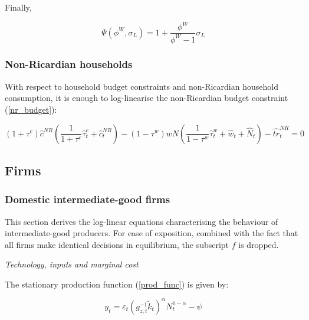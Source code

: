 \documentclass[a4paper,11pt]{article}
\numberwithin{equation}{section}
\begin{document}
	Finally, 
	
	\begin{equation*}
	\Psi(\phi^W,\sigma_L)=1+\frac{\phi^W}{\phi^W-1}\sigma_L
	\end{equation*} 
	
	\subsubsection{Non-Ricardian households}
	
	With respect to household budget constraints and non-Ricardian household consumption, it is enough to log-linearise the non-Ricardian budget constraint (\ref{nr_budget}):
	
	
	\begin{equation}
	\left(1+\tau^c\right)\hat{c}^{NR}\left(\frac{1}{1+\tau^c}\hat{\tau}_t^c+\hat{c}_t^{NR}\right)-\left(1-\tau^w\right)wN\left(\frac{1}{1-\tau^w}\hat{\tau}_t^w+\hat{w}_t+\hat{N}_t\right)-\hat{tr}_t^{NR} = 0
	\end{equation}
	
	\subsection{Firms}
	\subsubsection{Domestic intermediate-good firms}
	
	This section derives the log-linear equations characterising the behaviour of intermediate-good producers. For ease of exposition, combined with the fact that all firms make identical decisions in equilibrium, the subscript $f$ is dropped.
	
	\vspace{8pt}
	\textit{Technology, inputs and marginal cost}
	\vspace{8pt}
	
	The stationary production function (\ref{prod_func}) is given by:
	
	\begin{equation}
	y_t=\varepsilon_t\left(g_{z,t}^{-1}\tilde{k}_t\right)^{\alpha}N_t^{1-\alpha}-\psi
	\end{equation}
	
\end{document}
